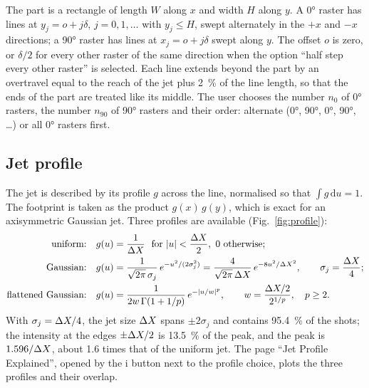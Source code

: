\documentclass[11pt,a4paper]{article}
\begin{document}
The part is a rectangle of length $W$ along $x$ and width $H$ along $y$. A 0° raster has lines at $y_j=o+j\delta$, $j=0,1,\dots$ with $y_j\le H$, swept alternately in the $+x$ and $-x$ directions; a 90° raster has lines at $x_j=o+j\delta$ swept along $y$. The offset $o$ is zero, or $\delta/2$ for every other raster of the same direction when the option ``half step every other raster'' is selected. Each line extends beyond the part by an overtravel equal to the reach of the jet plus \SI{2}{\percent} of the line length, so that the ends of the part are treated like its middle. The user chooses the number $n_0$ of 0° rasters, the number $n_{90}$ of 90° rasters and their order: alternate (0°, 90°, 0°, 90°, \dots) or all 0° rasters first.

\subsection{Jet profile}

The jet is described by its profile $g$ across the line, normalised so that $\int g\,\mathrm{d}u=1$. The footprint is taken as the product $g(x)\,g(y)$, which is exact for an axisymmetric Gaussian jet. Three profiles are available (Fig.~\ref{fig:profile}):
\begin{align}
\text{uniform:}\quad & g(u)=\frac{1}{\Delta X}\ \text{ for } |u|<\frac{\Delta X}{2},\ 0 \text{ otherwise};\\
\text{Gaussian:}\quad & g(u)=\frac{1}{\sqrt{2\pi}\,\sigma_j}\,e^{-u^2/(2\sigma_j^2)}=\frac{4}{\sqrt{2\pi}\,\Delta X}\,e^{-8u^2/\Delta X^2},\qquad \sigma_j=\frac{\Delta X}{4};\\
\text{flattened Gaussian:}\quad & g(u)=\frac{1}{2w\,\Gamma(1+1/p)}\,e^{-|u/w|^p},\qquad w=\frac{\Delta X/2}{2^{1/p}},\quad p\ge2.
\label{eq:flat}
\end{align}
With $\sigma_j=\Delta X/4$, the jet size $\Delta X$ spans $\pm2\sigma_j$ and contains \SI{95.4}{\percent} of the shots; the intensity at the edges $\pm\Delta X/2$ is \SI{13.5}{\percent} of the peak, and the peak is $1.596/\Delta X$, about 1.6 times that of the uniform jet. The page ``Jet Profile Explained'', opened by the \textsf{i} button next to the profile choice, plots the three profiles and their overlap.
\end{document}
